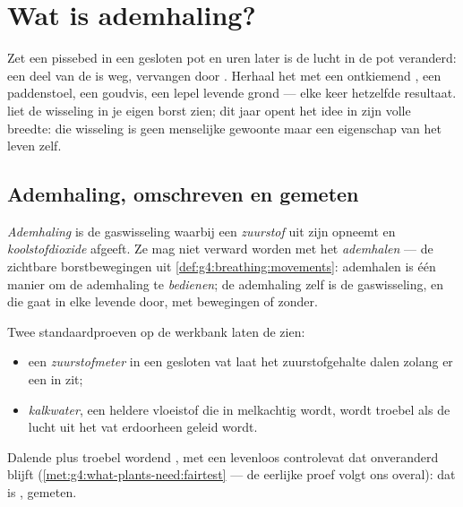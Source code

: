 \chapter{Wat is ademhaling?}\label{ch:g7:what-is-respiration}

Zet een pissebed in een gesloten pot en uren later is de lucht in de pot
veranderd: een deel van de  is weg, vervangen door
. Herhaal het met een ontkiemend , een paddenstoel,
een goudvis, een lepel levende grond --- elke keer hetzelfde resultaat.
 liet de wisseling in je eigen borst
zien; dit jaar opent het idee in zijn volle breedte: die wisseling is geen
menselijke gewoonte maar een eigenschap van het leven zelf.

\section{Ademhaling, omschreven en gemeten}

\begin{definition}[Ademhaling]\label{def:g7:what-is-respiration:respiration}
\emph{Ademhaling} is de gaswisseling waarbij een  \emph{zuurstof} uit zijn  opneemt en
\emph{koolstofdioxide} afgeeft. Ze mag niet
verward worden met het \emph{ademhalen} --- de zichtbare
borstbewegingen uit \cref{def:g4:breathing:movements}: ademhalen is één
manier om de ademhaling te \emph{bedienen}; de ademhaling zelf is de
gaswisseling, en die gaat in elke levende  door, met bewegingen of
zonder.
\end{definition}

\begin{proposition}\label{prop:g7:what-is-respiration:shown}
Twee standaardproeven op de werkbank laten de  zien:
\begin{itemize}
  \item een \emph{zuurstofmeter} in een gesloten vat laat het
        zuurstofgehalte dalen zolang er een  in zit;
  \item \emph{kalkwater}, een heldere vloeistof die in
         melkachtig wordt, wordt troebel als de lucht uit
        het vat erdoorheen geleid wordt.
\end{itemize}
Dalende  plus troebel wordend , met een levenloos
controlevat dat onveranderd blijft
(\cref{met:g4:what-plants-need:fairtest} --- de eerlijke proef volgt ons
overal): dat is , gemeten.
\end{proposition}
\admitted

